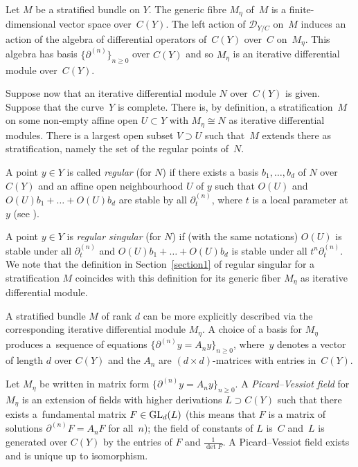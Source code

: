 \documentclass[10pt,a4paper]{amsart}
\numberwithin{equation}{section}
\begin{document}
Let $M$ be a stratified bundle on $Y$. The generic fibre $M_\eta$ of~$M$ is a finite-dimensional vector space over~$C(Y)$. The left action of $\mathcal{D}_{Y/C}$ on~$M$ induces an action of the algebra of differential operators of~$C(Y)$ over~$C$ on~$M_\eta$. This algebra has basis $\big\{\partial ^{(n)}\big\}_{n\geq 0}$ over $C(Y)$ and so $M_\eta$ is an iterative differential module over~$C(Y)$.

Suppose now that an iterative differential module $N$ over~$C(Y)$ is given. Suppose that the curve~$Y$ is complete. There is, by definition, a stratification~$M$ on some non-empty affine open $U\subset Y$ with $M_\eta \cong N$ as iterative differential modules. There is a largest open subset $V\supset U$ such that~$M$ extends there as stratification, namely the set of the regular points of~$N$.

A point $y\in Y$ is called {\it regular} (for $N$) if there exists a basis $b_1,\dots ,b_d$ of $N$ over $C(Y)$ and an affine open neighbourhood $U$ of $y$ such that $O(U)$ and $O(U)b_1+\dots +O(U)b_d$ are stable by all $\partial ^{(n)}_t$, where $t$ is a local parameter at $y$ (see \cite[Section~7 and Corollary~6.2(3)]{Ma-vdP1}).

A point $y\in Y$ is {\it regular singular} (for $N$) if (with the same notations) $O(U)$ is stable under all $\partial^{(n)}_t$ and $O(U)b_1+\dots +O(U)b_d$ is stable under all $t^n\partial_t^{(n)}$. We note that the definition in Section~\ref{section1} of regular singular for a stratification $M$ coincides with this definition for its generic fiber $M_\eta$ as iterative differential module.

A stratified bundle $M$ of rank $d$ can be more explicitly described via the corresponding iterative differential module $M_\eta$. A choice of a basis for $M_\eta$ produces a~sequence of equations $\big\{\partial ^{(n)}y=A_ny\big\}_{n\geq 0}$, where~$y$ denotes a vector of length $d$ over $C(Y)$ and the $A_n$ are $(d\times d)$-matrices with entries in~$C(Y)$.

Let $M_\eta$ be written in matrix form $\big\{ \partial^{(n)}y=A_ny\big\}_{n\geq 0}$. A {\it Picard--Vessiot field} for $M_\eta$ is an extension of fields with higher derivations $L\supset C(Y)$ such that there exists a~fundamental matrix $F\in {\rm GL}_d(L)$ (this means that $F$ is a matrix of solutions $ \partial^{(n)}F=A_nF$ for all~$n$); the field of constants of $L$ is~$C$ and~$L$ is generated over $C(Y)$ by the entries of $F$ and $\frac{1}{\det F}$. A Picard--Vessiot field exists and is unique up to isomorphism.
\end{document}
